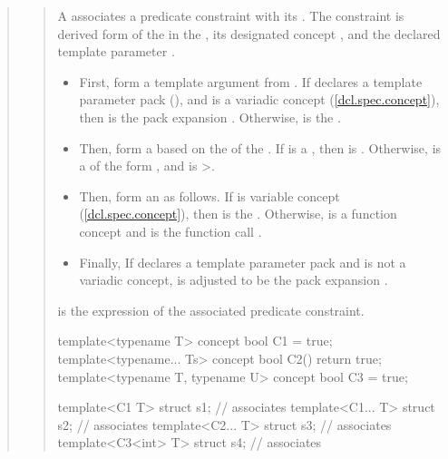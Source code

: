 \begin{quote}
\begin{quote}
\pnum
A  associates a predicate
constraint with its . The constraint
is derived form of the   in the
, its designated concept ,
and the declared template parameter .
% 
\begin{itemize}
\item First, form a template argument  from . If  
declares a template parameter pack (),
and  is a variadic concept (\ref{dcl.spec.concept}), then  is 
the pack expansion . Otherwise,  is the 
 .

\item Then, form a   based on the 
  of the 
. If  is 
a , then  is . Otherwise, 
 is a  of the form
, and  is >.

\item Then, form an   as follows. 
If  is variable concept (\ref{dcl.spec.concept}), then  is the 
 . Otherwise,  is a function 
concept and  is the function call .

\item Finally, If  declares a template parameter pack and 
 is not a variadic concept,  is adjusted to be the pack 
expansion .
\end{itemize}
% 
 is the expression of the associated predicate constraint.
% 
\enterexample
\begin{codeblock}
template<typename T> concept bool C1 = true;
template<typename... Ts> concept bool C2() { return true; }
template<typename T, typename U> concept bool C3 = true;

template<C1 T> struct s1;      // associates 
template<C1... T> struct s2;   // associates 
template<C2... T> struct s3;   // associates 
template<C3<int> T> struct s4; // associates 
\end{codeblock}
\exitexample


\end{quote}
\end{quote}
